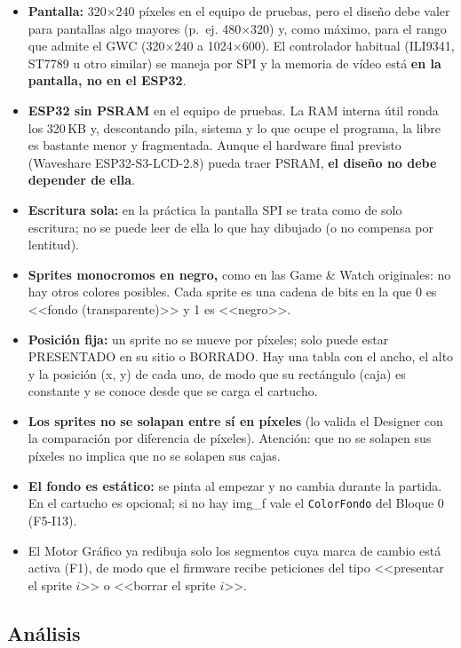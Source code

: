 \begin{itemize}
	\item \textbf{Pantalla:} 320$\times$240 píxeles en el equipo de pruebas, pero el diseño debe valer para pantallas algo mayores (p.~ej. 480$\times$320) y, como máximo, para el rango que admite el GWC (320$\times$240 a 1024$\times$600). El controlador habitual (ILI9341, ST7789 u otro similar) se maneja por SPI y la memoria de vídeo está \textbf{en la pantalla, no en el ESP32}.
	\item \textbf{ESP32 sin PSRAM} en el equipo de pruebas. La RAM interna útil ronda los 320\,KB y, descontando pila, sistema y lo que ocupe el programa, la libre es bastante menor y fragmentada. Aunque el hardware final previsto (Waveshare ESP32-S3-LCD-2.8) pueda traer PSRAM, \textbf{el diseño no debe depender de ella}.
	\item \textbf{Escritura sola:} en la práctica la pantalla SPI se trata como de solo escritura; no se puede leer de ella lo que hay dibujado (o no compensa por lentitud).
	\item \textbf{Sprites monocromos en negro,} como en las Game \& Watch originales: no hay otros colores posibles. Cada sprite es una cadena de bits en la que 0 es <<fondo (transparente)>> y 1 es <<negro>>.
	\item \textbf{Posición fija:} un sprite no se mueve por píxeles; solo puede estar PRESENTADO en su sitio o BORRADO. Hay una tabla con el ancho, el alto y la posición (x, y) de cada uno, de modo que su rectángulo (caja) es constante y se conoce desde que se carga el cartucho.
	\item \textbf{Los sprites no se solapan entre sí en píxeles} (lo valida el Designer con la comparación por diferencia de píxeles). Atención: que no se solapen sus píxeles no implica que no se solapen sus cajas.
	\item \textbf{El fondo es estático:} se pinta al empezar y no cambia durante la partida. En el cartucho es opcional; si no hay img\_f vale el \texttt{ColorFondo} del Bloque 0 (F5-I13).
	\item El Motor Gráfico ya redibuja solo los segmentos cuya marca de cambio está activa (F1), de modo que el firmware recibe peticiones del tipo <<presentar el sprite $i$>> o <<borrar el sprite $i$>>.
\end{itemize}

\subsection{Análisis}
\label{sec:F6I91Analisis}

